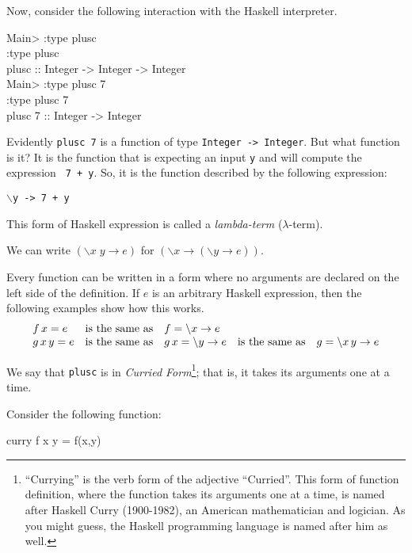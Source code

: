 \documentclass[11pt]{article}
\begin{document}
Now, consider the following interaction with the Haskell interpreter.
\begin{program*}
  \> Main> :type plusc    \\
  \> :type plusc    \\
  \> plusc :: Integer -> Integer -> Integer    \\
  \> Main> :type plusc 7    \\
  \> :type plusc 7    \\
  \> plusc 7 :: Integer -> Integer    \\
\end{program*}
Evidently {\tt{plusc 7}} is a function of type {\tt{Integer -> Integer}}.  But
what function is it?  It is the function that is expecting an input {\tt{y}}
and will compute the expression {\tt{ 7 + y}}.  So, it is the function
described by the following expression:\\ \begin{center}{\tt{$\backslash$y -> 7
+ y}} \end{center} This form of Haskell expression is called a
{\em{lambda-term}} ($\lambda$-term).

We can write $(\backslash x \; y \rightarrow e)$  for  $(\backslash x \rightarrow (\backslash y \rightarrow e))$.

Every function can be written in a form where no arguments are declared on the
left side of the definition.  If $e$ is an arbitrary Haskell expression, then
the following examples show how this works.
\[\begin{array}{lclcl}
f\, x = e & {\rm{is\ the\ same\ as }} & f = \backslash{}x \rightarrow e \\
g \, x \, y = e & {\rm{is\ the\ same\ as }} & g \, x = \backslash{}y \rightarrow e & {\rm{is\ the\ same\ as }} & g = \backslash{}x\, y \rightarrow e \\
\end{array}\]


We say that {\tt{plusc}} is in {\em{Curried Form}}\footnote{``Currying'' is
the verb form of the adjective ``Curried''.  This form of function definition,
where the function takes its arguments one at a time, is named after Haskell
Curry (1900-1982), an American mathematician and logician.  As you might guess,
the Haskell programming language is named after him as well.}; that is, it
takes its arguments one at a time.


Consider the following function:
\begin{program*}
  \> curry f x y  =  f(x,y)
\end{program*}
\end{document}
